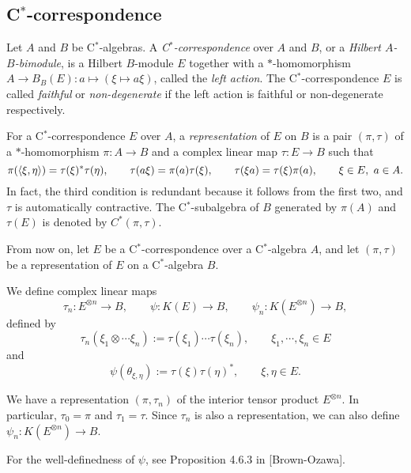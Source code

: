\documentclass{../../../small}
\begin{document}
\subsection{C$^*$-correspondence}



\begin{defn}[C$^*$-correspondences]
Let $A$ and $B$ be C$^*$-algebras.
A \emph{C$^*$-correspondence} over $A$ and $B$, or a \emph{Hilbert $A$-$B$-bimodule}, is a Hilbert $B$-module $E$ together with a $*$-homomorphism $A\to B_B(E):a\mapsto(\xi\mapsto a\xi)$, called the \emph{left action}.
The C$^*$-correspondence $E$ is called \emph{faithful} or \emph{non-degenerate} if the left action is faithful or non-degenerate respectively.
\end{defn}


\begin{defn}
For a C$^*$-correspondence $E$ over $A$, a \emph{representation} of $E$ on $B$ is a pair $(\pi,\tau)$ of a $*$-homomorphism $\pi:A\to B$ and a complex linear map $\tau:E\to B$ such that
\[\pi(\langle\xi,\eta\rangle)=\tau(\xi)^*\tau(\eta),\qquad\tau(a\xi)=\pi(a)\tau(\xi),\qquad\tau(\xi a)=\tau(\xi)\pi(a),\qquad\xi\in E,\ a\in A.\]
In fact, the third condition is redundant because it follows from the first two, and $\tau$ is automatically contractive.
The C$^*$-subalgebra of $B$ generated by $\pi(A)$ and $\tau(E)$ is denoted by $C^*(\pi,\tau)$.
\end{defn}

From now on, let $E$ be a C$^*$-correspondence over a C$^*$-algebra $A$, and let $(\pi,\tau)$ be a representation of $E$ on a C$^*$-algebra $B$.

\begin{defn}
We define complex linear maps
\[\tau_n:E^{\otimes n}\to B,\qquad\psi:K(E)\to B,\qquad\psi_n:K(E^{\otimes n})\to B,\]
defined by
\[\tau_n(\xi_1\otimes\cdots\xi_n):=\tau(\xi_1)\cdots\tau(\xi_n),\qquad\xi_1,\cdots,\xi_n\in E\]
and
\[\psi(\theta_{\xi,\eta}):=\tau(\xi)\tau(\eta)^*,\qquad\xi,\eta\in E.\]

We have a representation $(\pi,\tau_n)$ of the interior tensor product $E^{\otimes n}$.
In particular, $\tau_0=\pi$ and $\tau_1=\tau$.
Since $\tau_n$ is also a representation, we can also define $\psi_n:K(E^{\otimes n})\to B$.
\end{defn}
\begin{rmk}
For the well-definedness of $\psi$, see Proposition 4.6.3 in [Brown-Ozawa].
\end{rmk}
\end{document}
